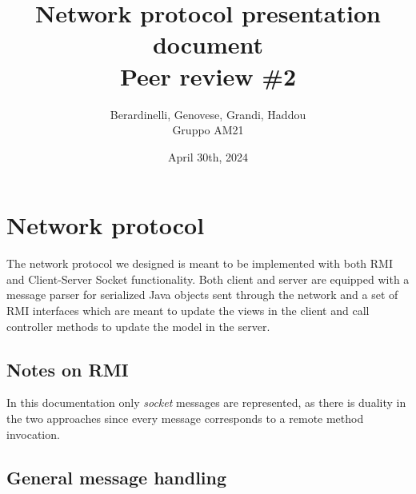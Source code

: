 \documentclass[12pt]{article}
\title{Network protocol presentation document\\Peer review \#2}
\author{Berardinelli, Genovese, Grandi, Haddou\\Gruppo AM21}
\date{April 30th, 2024}
\begin{document}
\maketitle


\section{Network protocol}
The network protocol we designed is meant to be implemented with both RMI and Client-Server Socket functionality. Both client and server are equipped with a message parser for serialized Java objects sent through the network and a set of RMI interfaces which are meant to update the views in the client and call controller methods to update the model in the server.

\subsection{Notes on RMI}
In this documentation only \textit{socket} messages are represented, as there is duality in the two approaches since every message corresponds to a remote method invocation.
\newpage
\subsection{General message handling}
\end{document}
